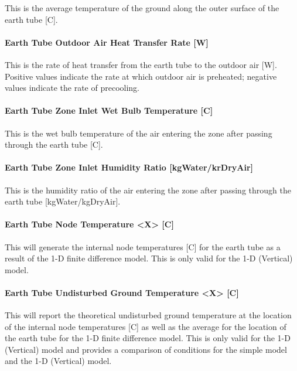 This is the average temperature of the ground along the outer surface of the earth tube {[}C{]}.

\paragraph{Earth Tube Outdoor Air Heat Transfer Rate {[}W{]}}\label{earth-tube-outdoor-air-heat-transfer-rate-w}

This is the rate of heat transfer from the earth tube to the outdoor air {[}W{]}.~ Positive values indicate the rate at which outdoor air is preheated; negative values indicate the rate of precooling.

\paragraph{Earth Tube Zone Inlet Wet Bulb Temperature {[}C{]}}\label{earth-tube-zone-inlet-wet-bulb-temperature-c}

This is the wet bulb temperature of the air entering the zone after passing through the earth tube {[}C{]}.

\paragraph{Earth Tube Zone Inlet Humidity Ratio {[}kgWater/krDryAir{]}}\label{earth-tube-zone-inlet-humidity-ratio-kgWater/kgDryAir}

This is the humidity ratio of the air entering the zone after passing through the earth tube {[}kgWater/kgDryAir{]}.

\paragraph{Earth Tube Node Temperature <X> {[}C{]}}\label{earth-tube-node-temperatures-c}

This will generate the internal node temperatures {[}C{]} for the earth tube as a result of the 1-D finite difference model.  This is only valid for the 1-D (Vertical) model.

\paragraph{Earth Tube Undisturbed Ground Temperature <X> {[}C{]}}\label{earth-tube-undisturbed-node-temperatures-c}

This will report the theoretical undisturbed ground temperature at the location of the internal node temperatures {[}C{]} as well as the average for the location of the earth tube for the 1-D finite difference model.  This is only valid for the 1-D (Vertical) model and provides a comparison of conditions for the simple model and the 1-D (Vertical) model.

